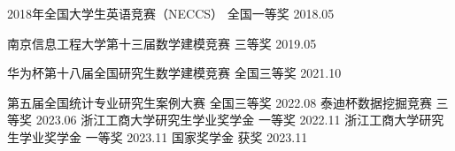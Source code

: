 
\begin{cvhonors}
  \cvhonor
    {2018年全国大学生英语竞赛（NECCS）} %
    {} %
    {全国一等奖} %
    {2018.05} %

  \cvhonor
    {南京信息工程大学第十三届数学建模竞赛} %
    {} %
    {三等奖} %
    {2019.05} %

\cvhonor
  {华为杯第十八届全国研究生数学建模竞赛} %
  {} %
  {全国三等奖} %
  {2021.10} %

  \cvhonor
    {第五届全国统计专业研究生案例大赛} %
    {} %
    {全国三等奖} %
    {2022.08} %
\cvhonor
  {泰迪杯数据挖掘竞赛} %
  {} %
  {三等奖} %
  {2023.06} 
\cvhonor
  {浙江工商大学研究生学业奖学金} %
  {} %
  {一等奖} %
  {2022.11} %
\cvhonor
  {浙江工商大学研究生学业奖学金} %
  {} %
  {一等奖} %
  {2023.11} 
\cvhonor
  {国家奖学金} %
  {} %
  {获奖} %
  {2023.11} 

\end{cvhonors}

